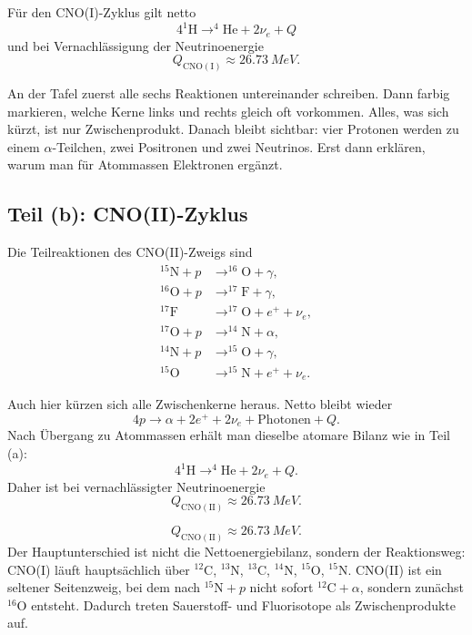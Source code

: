 \documentclass[11pt,a4paper]{scrartcl}
\newcommand{\isotope}[2]{^{#1}\mathrm{#2}}
\theoremstyle{definition}
\theoremstyle{plain}
\theoremstyle{remark}
\begin{document}
\begin{answerbox}
Für den CNO(I)-Zyklus gilt netto
\[
    \boxed{4\isotope{1}{H}\longrightarrow \isotope{4}{He}+2\nu_e+Q}
\]
und bei Vernachlässigung der Neutrinoenergie
\[
    \boxed{Q_{\mathrm{CNO(I)}}\approx \SI{26.73}{MeV}}.
\]
\end{answerbox}

\begin{talkbox}
An der Tafel zuerst alle sechs Reaktionen untereinander schreiben. Dann farbig markieren, welche Kerne links und rechts gleich oft vorkommen. Alles, was sich kürzt, ist nur Zwischenprodukt. Danach bleibt sichtbar: vier Protonen werden zu einem \(\alpha\)-Teilchen, zwei Positronen und zwei Neutrinos. Erst dann erklären, warum man für Atommassen Elektronen ergänzt.
\end{talkbox}

\subsection{Teil (b): CNO(II)-Zyklus}

Die Teilreaktionen des CNO(II)-Zweigs sind
\begin{align*}
    \isotope{15}{N}+p &\longrightarrow \isotope{16}{O}+\gamma,\\
    \isotope{16}{O}+p &\longrightarrow \isotope{17}{F}+\gamma,\\
    \isotope{17}{F} &\longrightarrow \isotope{17}{O}+e^+ + \nu_e,\\
    \isotope{17}{O}+p &\longrightarrow \isotope{14}{N}+\alpha,\\
    \isotope{14}{N}+p &\longrightarrow \isotope{15}{O}+\gamma,\\
    \isotope{15}{O} &\longrightarrow \isotope{15}{N}+e^+ + \nu_e.
\end{align*}

\begin{calculationbox}[title=Gesamtbilanz]
Auch hier kürzen sich alle Zwischenkerne heraus. Netto bleibt wieder
\[
    4p \longrightarrow \alpha + 2e^+ + 2\nu_e + \text{Photonen} + Q.
\]
Nach Übergang zu Atommassen erhält man dieselbe atomare Bilanz wie in Teil (a):
\[
    4\isotope{1}{H} \longrightarrow \isotope{4}{He}+2\nu_e+Q.
\]
Daher ist bei vernachlässigter Neutrinoenergie
\[
    Q_{\mathrm{CNO(II)}}\approx \SI{26.73}{MeV}.
\]
\end{calculationbox}

\begin{answerbox}
\[
    \boxed{Q_{\mathrm{CNO(II)}}\approx \SI{26.73}{MeV}}.
\]
Der Hauptunterschied ist nicht die Nettoenergiebilanz, sondern der Reaktionsweg: CNO(I) läuft hauptsächlich über \(\isotope{12}{C}\), \(\isotope{13}{N}\), \(\isotope{13}{C}\), \(\isotope{14}{N}\), \(\isotope{15}{O}\), \(\isotope{15}{N}\). CNO(II) ist ein seltener Seitenzweig, bei dem nach \(\isotope{15}{N}+p\) nicht sofort \(\isotope{12}{C}+\alpha\), sondern zunächst \(\isotope{16}{O}\) entsteht. Dadurch treten Sauerstoff- und Fluorisotope als Zwischenprodukte auf.
\end{answerbox}
\end{document}
